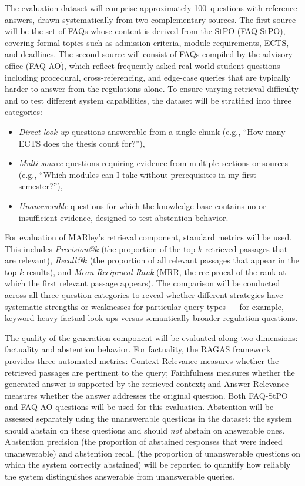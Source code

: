 \documentclass[10pt,twocolumn]{article}
\begin{document}
The evaluation dataset will comprise approximately 100~questions with reference answers, drawn systematically from two complementary sources. The first source will be the set of FAQs whose content is derived from the StPO (FAQ-StPO), covering formal topics such as admission criteria, module requirements, ECTS, and deadlines. The second source will consist of FAQs compiled by the advisory office (FAQ-AO), which reflect frequently asked real-world student questions --- including procedural, cross-referencing, and edge-case queries that are typically harder to answer from the regulations alone. To ensure varying retrieval difficulty and to test different system capabilities, the dataset will be stratified into three categories:
\begin{itemize}[leftmargin=1.2em]
    \item \emph{Direct look-up} questions answerable from a single chunk (e.g., ``How many ECTS does the thesis count for?''),
    \item \emph{Multi-source} questions requiring evidence from multiple sections or sources (e.g., ``Which modules can I take without prerequisites in my first semester?''),
    \item \emph{Unanswerable} questions for which the knowledge base contains no or insufficient evidence, designed to test abstention behavior.
\end{itemize}

For evaluation of MARley's retrieval component, standard metrics will be used. This includes \emph{Precision@$k$} (the proportion of the top-$k$ retrieved passages that are relevant), \emph{Recall@$k$} (the proportion of all relevant passages that appear in the top-$k$ results), and \emph{Mean Reciprocal Rank} (MRR, the reciprocal of the rank at which the first relevant passage appears). The comparison will be conducted across all three question categories to reveal whether different strategies have systematic strengths or weaknesses for particular query types --- for example, keyword-heavy factual look-ups versus semantically broader regulation questions.

The quality of the generation component will be evaluated along two dimensions: factuality and abstention behavior. For factuality, the RAGAS framework~\cite{es2025ragas} provides three automated metrics: Context Relevance measures whether the retrieved passages are pertinent to the query; Faithfulness measures whether the generated answer is supported by the retrieved context; and Answer Relevance measures whether the answer addresses the original question. Both FAQ-StPO and FAQ-AO questions will be used for this evaluation. Abstention will be assessed separately using the unanswerable questions in the dataset: the system should abstain on these questions and should \emph{not} abstain on answerable ones. Abstention precision (the proportion of abstained responses that were indeed unanswerable) and abstention recall (the proportion of unanswerable questions on which the system correctly abstained) will be reported to quantify how reliably the system distinguishes answerable from unanswerable queries.
\end{document}
